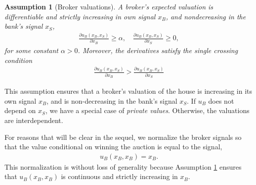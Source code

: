 \documentclass[11pt,twopage]{article}
\newtheorem{assumption}{Assumption}
{\bf}{\it}
\begin{document}
\begin{assumption}[Broker valuations]\label{as:valuations}
A broker's expected valuation is differentiable and strictly increasing in own signal $x_B$, and nondecreasing in the bank's signal $x_S$, 
\begin{align}
  \frac{\partial u_B(x_B,x_S)}{\partial x_B}\geq \alpha,\quad
  \frac{\partial u_B(x_B,x_S)}{\partial x_S} \geq 0, \nonumber
\end{align}
for some constant $\alpha>0$.
Moreover, the derivatives satisfy the \emph{single crossing} condition 
\begin{align}
  \frac{\partial u_B(x_B,x_S)}{\partial x_B}>\frac{\partial u_B(x_B,x_S)}{\partial x_S} \nonumber
\end{align}

\label{as:utilities}
\end{assumption}




This assumption ensures that a broker's valuation of the house is
increasing in its own signal $x_B$, and is
non-decreasing in the bank's signal $x_S$. If $u_B$ does not
depend on $x_S$, we have a special case of \emph{private values}. Otherwise, the valuations are interdependent. 



For reasons that will be clear in the sequel, we normalize the broker signals so that the value conditional on winning the auction is equal to the signal,
\begin{align}
u_B(x_B,x_B) = x_B.
\label{bnorm}
\end{align}
This normalization is without loss of generality because Assumption \ref{as:valuations} ensures that $u_B(x_B,x_B)$ is continuous and strictly increasing in $x_B$.
\end{document}
